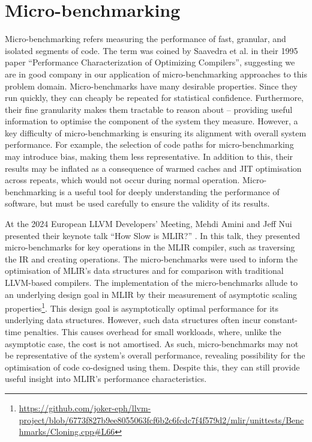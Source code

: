 \section{Micro-benchmarking}
\label{sec:ubenchmark}

Micro-benchmarking refers measuring the performance of fast, granular, and isolated segments of code.
The term was coined by Saavedra et al. in their 1995 paper \cite{saavedraPerformanceCharacterizationOptimizing1995} ``Performance Characterization of Optimizing Compilers'', suggesting we are in good company in our application of micro-benchmarking approaches to this problem domain.
Micro-benchmarks have many desirable properties. Since they run quickly, they can cheaply be repeated for statistical confidence.
Furthermore, their fine granularity makes them tractable to reason about -- providing useful information to optimise the component of the system they measure.
However, a key difficulty of micro-benchmarking is ensuring its alignment with overall system performance. For example, the selection of code paths for micro-benchmarking may introduce bias, making them less representative. In addition to this, their results may be inflated as a consequence of warmed caches and JIT optimisation across repeats, which would not occur during normal operation.
Micro-benchmarking is a useful tool for deeply understanding the performance of software, but must be used carefully to ensure the validity of its results.

At the 2024 European LLVM Developers' Meeting, Mehdi Amini and Jeff Nui
presented their keynote talk ``How Slow is MLIR?'' \cite{aminiHowSlowMLIR2024}.
In this talk, they presented micro-benchmarks for key operations in the MLIR compiler, such as traversing the IR and creating operations. The micro-benchmarks were used to inform the optimisation of MLIR's data structures and for comparison with traditional LLVM-based compilers. The implementation of the micro-benchmarks allude to an underlying design goal in MLIR by their measurement of asymptotic scaling properties\footnote{\url{https://github.com/joker-eph/llvm-project/blob/6773f827b9ee8055063fcf6b2c6fcdc7f4f579d2/mlir/unittests/Benchmarks/Cloning.cpp\#L66}}. This design goal is asymptotically optimal performance for its underlying data structures. However, such data structures often incur constant-time penalties. This causes overhead for small workloads, where, unlike the asymptotic case, the cost is not amortised.
As such, micro-benchmarks may not be representative of the system's overall performance, revealing possibility for the optimisation of code co-designed using them.
Despite this, they can still provide useful insight into MLIR's performance characteristics. 

